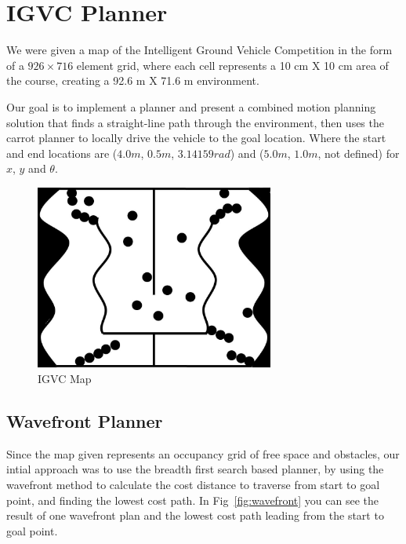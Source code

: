 \documentclass{article}
\begin{document}
\newpage
\section{IGVC Planner}
\label{sec:igvc_planner}
We were given a map of the Intelligent Ground Vehicle Competition in the form of a $926 \times 716$ element grid, where each cell
represents a 10 cm X 10 cm area of the course, creating a 92.6 m X 71.6 m environment. 

Our goal is to implement a planner and present a combined motion planning solution that finds a straight-line path through the environment, then uses the carrot planner to locally drive the vehicle to the goal location. Where the start and end locations are ($4.0m$, $0.5m$, $3.14159 rad$) and ($5.0 m$, $1.0 m$, not defined) for $x$, $y$ and $θ$.


\begin{figure}[H]
	\centering
	\includegraphics[width=0.7\textwidth]{images/IGVCmap.jpg}
	\caption{IGVC Map}
	\label{fig:igvc_map}
\end{figure}



\newpage
\subsection{Wavefront Planner}
\label{subsec:wavefront}
Since the map given represents an occupancy grid of free space and obstacles, our intial approach was to use the breadth first search based planner, by using the wavefront method to calculate the cost distance to traverse from start to goal point, and finding the lowest cost path. In Fig~\ref{fig:wavefront} you can see the result of one wavefront plan and the lowest cost path leading from the start to goal point.
\end{document}
